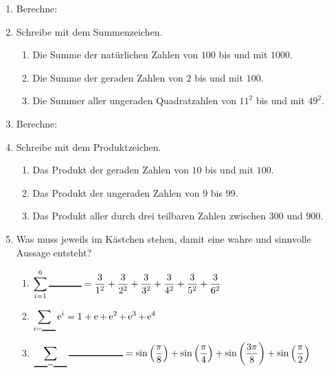 \documentclass[11pt,oneside]{article}
\begin{document}
	\begin{aufgabe}
		\begin{enumerate}
			\item Berechne:
			\item Schreibe mit dem Summenzeichen.
			\begin{enumerate}[label=\alph*)]
				\item Die Summe der natürlichen Zahlen von $100$ bis und mit $1000$.
				\item Die Summe der geraden Zahlen von $2$ bis und mit $100$.
				\item Die Summer aller ungeraden Quadratzahlen von $11^2$ bis und mit $49^2$.
			\end{enumerate}
			\item Berechne:
			\item Schreibe mit dem Produktzeichen.
			\begin{enumerate}[label=\alph*)]
				\item Das Produkt der geraden Zahlen von $10$ bis und mit $100$.
				\item Das Produkt der ungeraden Zahlen von $9$ bis $99$.
				\item Das Produkt aller durch drei teilbaren Zahlen zwischen $300$ und $900$.
			\end{enumerate}
			\item Was muss jeweils im Kästchen stehen, damit eine wahre und sinnvolle Aussage entsteht?
			\begin{enumerate}[label=\alph*)]
				\item $\displaystyle\sum_{i=1}^6 \gap{1.2}=\frac{3}{1^2}+\frac{3}{2^2}+\frac{3}{3^2}+\frac{3}{4^2}+\frac{3}{5^2}+\frac{3}{6^2}$
				\item $\displaystyle\sum_{i=\gap{0.5}}\exp{i}=1+\e+\exp{2}+\exp{3}+\exp{4}$
				\item $\displaystyle\sum_{\gap{0.5}=\gap{0.5}}\gap{2}=\sin{\frac{\pi}{8}}+\sin{\frac{\pi}{4}}+\sin{\frac{3\pi}{8}}+\sin{\frac{\pi}{2}}$
			\end{enumerate}
		\end{enumerate}
	\end{aufgabe}
\end{document}
